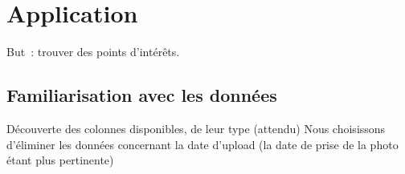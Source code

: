 \chapter{Application}

    But~: trouver des points d’intérêts.

\section{Familiarisation avec les données}
    Découverte des colonnes disponibles, de leur type (attendu)
    Nous choisissons d'éliminer les données concernant la date d'upload (la date de prise de la photo étant plus pertinente)

